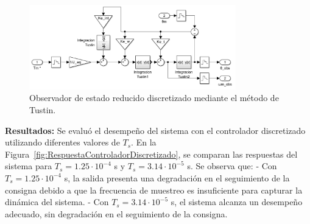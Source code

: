\documentclass{article}
\begin{document}
\begin{figure}[H]
    \centering
    \includegraphics[width=0.8\textwidth]{Imagenes/Observador_PID_discreto.png}
    \caption{Observador de estado reducido discretizado mediante el método de Tustin.}
    \label{fig:observador_estado_discreto}
\end{figure}

\textbf{Resultados:}
Se evaluó el desempeño del sistema con el controlador discretizado utilizando diferentes valores de $T_s$. En la Figura~\ref{fig:RespuestaControladorDiscretizado}, se comparan las respuestas del sistema para $T_s = 1.25 \cdot 10^{-4}$ s y $T_s = 3.14 \cdot 10^{-5}$ s. Se observa que:
- Con $T_s = 1.25 \cdot 10^{-4}$ s, la salida presenta una degradación en el seguimiento de la consigna debido a que la frecuencia de muestreo es insuficiente para capturar la dinámica del sistema.
- Con $T_s = 3.14 \cdot 10^{-5}$ s, el sistema alcanza un desempeño adecuado, sin degradación en el seguimiento de la consigna.
\end{document}
